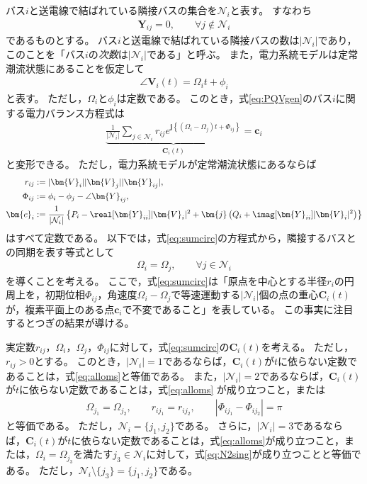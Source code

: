 \documentclass[tombow,dvipdfmx]{corona-a5-1.1}
\begin{document}
バス$i$と送電線で結ばれている隣接バスの集合を$\mathcal{N}_i$と表す。
すなわち
\begin{align*}
\bm{Y}_{ij} = 0,\qquad \forall j \notin \mathcal{N}_i
\end{align*}
であるものとする。
バス$i$と送電線で結ばれている隣接バスの数は$|\mathcal{N}_i|$であり，このことを「バス$i$の\emph{次数}は$|\mathcal{N}_i|$である」と呼ぶ。
また，電力系統モデルは定常潮流状態にあることを仮定して
\begin{align*}
\angle \bm{V}_i (t) = \Omega_i t +\phi_i
\end{align*}
と表す。
ただし，$\Omega_i$と$\phi_i$は定数である。
このとき，式\ref{eq:PQVgen}のバス$i$に関する電力バランス方程式は
\begin{align}\label{eq:sumcirc}
\underbrace{
\frac{1}{|\mathcal{N}_i|}\sum_{j \in \mathcal{N}_i } 
r_{ij}
e^{\bm{j} 
\left\{
(\Omega_i - \Omega_j)t + 
\Phi_{ij}
\right\} }
}_{\bm{C}_i (t)}
= \bm{c}_i
\end{align}
と変形できる。
ただし，電力系統モデルが定常潮流状態にあるならば
\begin{align*}
r_{ij} &:=|\bm{V}_i| |\bm{V}_j| |\bm{Y}_{ij}|, 
\\
\Phi_{ij} &:= \phi_i - \phi_j - \angle \bm{Y}_{ij},
\\
\bm{c}_i &:=  \frac{1}{|\mathcal{N}_i|}
\left\{
P_i - \real[\bm{Y}_{ii}] |\bm{V}_i|^2
+ \bm{j}
\left(
Q_i + \imag [\bm{Y}_{ii}] |\bm{V}_i|^2
\right)
\right\}
\end{align*}
はすべて定数である。
以下では，式\ref{eq:sumcirc}の方程式から，隣接するバスとの同期を表す等式として
\begin{align}\label{eq:alloms}
\Omega_i = \Omega_{j} 
,\qquad 
\forall j\in \mathcal{N}_i
\end{align}
を導くことを考える。
ここで，式\ref{eq:sumcirc}は「原点を中心とする半径$r_i$の円周上を，初期位相$\Phi_{ij}$，角速度$\Omega_i-\Omega_j$で等速運動する$|\mathcal{N}_i|$個の点の重心$\bm{C}_i (t)$が，複素平面上のある点$\bm{c}_i$で不変であること」を表している。
この事実に注目するとつぎの結果が導ける。


\begin{補題}[電力バランス方程式から導かれるバスの同期]
\label{lem:sumc2}
実定数$r_{ij}$，$\Omega_i$，$\Omega_j$，$\Phi_{ij}$に対して，式\ref{eq:sumcirc}の$\bm{C}_i (t)$を考える。
ただし，$r_{ij}>0$とする。
このとき，$|\mathcal{N}_i|=1$であるならば，$\bm{C}_i (t)$が$t$に依らない定数であることは，式\ref{eq:alloms}と等価である。
また，$|\mathcal{N}_i|=2$であるならば，$\bm{C}_i (t)$が$t$に依らない定数であることは，式\ref{eq:alloms}
が成り立つこと，または
\begin{align}\label{eq:N2sing}
\Omega_{j_1} = \Omega_{j_2}
,\qquad
r_{i j_1} = r_{i j_2}
,\qquad
|\Phi_{i j_1}-\Phi_{i j_2}| = \pi
\end{align}
と等価である。
ただし，$\mathcal{N}_i = \{j_1,j_2\}$である。
さらに，$|\mathcal{N}_i|=3$であるならば，$\bm{C}_i (t)$が$t$に依らない定数であることは，式\ref{eq:alloms}が成り立つこと，または，$\Omega_{i} = \Omega_{j_3}$を満たす$j_3 \in \mathcal{N}_i$に対して，式\ref{eq:N2sing}が成り立つことと等価である。
ただし，$ \mathcal{N}_i \setminus \{j_3\}=\{j_1,j_2\}$である。
\end{補題}
\end{document}

